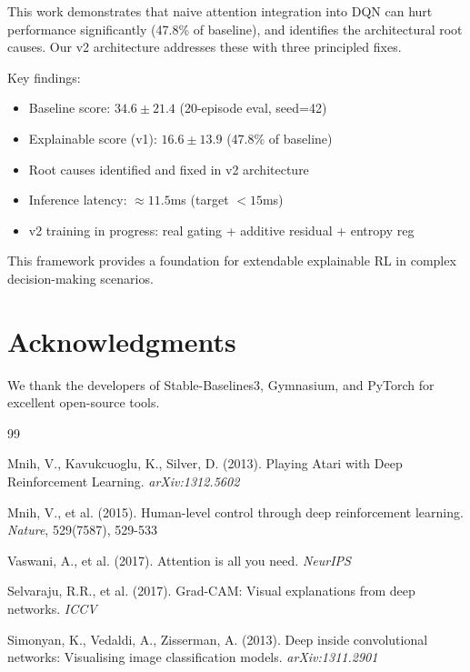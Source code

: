 \documentclass[11pt,a4paper]{article}
\begin{document}
This work demonstrates that naive attention integration into DQN can hurt performance significantly (47.8\% of baseline), and identifies the architectural root causes. Our v2 architecture addresses these with three principled fixes.

Key findings:
\begin{itemize}
    \item \checkmark Baseline score: $34.6 \pm 21.4$ (20-episode eval, seed=42)
    \item \checkmark Explainable score (v1): $16.6 \pm 13.9$ (47.8\% of baseline)
    \item \checkmark Root causes identified and fixed in v2 architecture
    \item \checkmark Inference latency: $\approx 11.5$ms (target $<15$ms) \checkmark
    \item \checkmark v2 training in progress: real gating + additive residual + entropy reg
\end{itemize}

This framework provides a foundation for extendable explainable RL in complex decision-making scenarios.

\section*{Acknowledgments}

We thank the developers of Stable-Baselines3, Gymnasium, and PyTorch for excellent open-source tools.

\begin{thebibliography}{99}

 Mnih, V., Kavukcuoglu, K., Silver, D. (2013). Playing Atari with Deep Reinforcement Learning. \textit{arXiv:1312.5602}

 Mnih, V., et al. (2015). Human-level control through deep reinforcement learning. \textit{Nature}, 529(7587), 529-533

 Vaswani, A., et al. (2017). Attention is all you need. \textit{NeurIPS}

 Selvaraju, R.R., et al. (2017). Grad-CAM: Visual explanations from deep networks. \textit{ICCV}

 Simonyan, K., Vedaldi, A., Zisserman, A. (2013). Deep inside convolutional networks: Visualising image classification models. \textit{arXiv:1311.2901}

\end{thebibliography}
\end{document}
